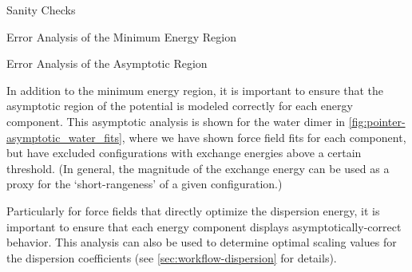 \begin{subsection}{Sanity Checks}
\begin{paragraph}{Error Analysis of the Minimum Energy Region}
\end{paragraph}

\begin{paragraph}{Error Analysis of the Asymptotic Region}

In addition to the minimum energy region, it is important to ensure that the
asymptotic region of the potential is modeled correctly for each energy
component. This asymptotic analysis is shown for the water dimer in
\cref{fig:pointer-asymptotic_water_fits}, where we have shown force field fits
for each component, but have excluded configurations with exchange energies
above a certain threshold. (In general, the magnitude of the \sapt exchange
energy can be used as a proxy for the `short-rangeness' of a given
configuration.) 

Particularly for force fields that directly optimize the dispersion energy, it
is important to ensure that each energy component displays
asymptotically-correct behavior. This analysis can also be used to determine
optimal scaling values for the dispersion coefficients (see
\cref{sec:workflow-dispersion} for details).
\end{paragraph}


\end{subsection}

